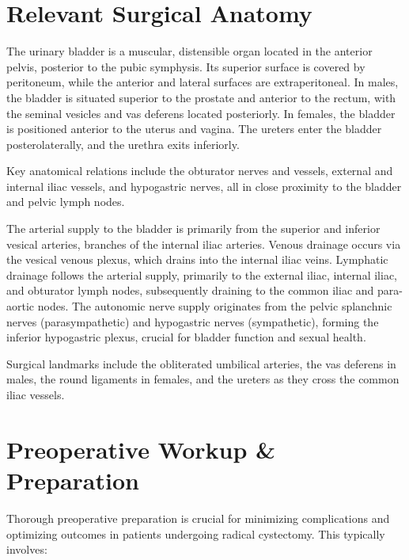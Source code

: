 \section*{Relevant Surgical Anatomy}
The urinary bladder is a muscular, distensible organ located in the anterior pelvis, posterior to the pubic symphysis. Its superior surface is covered by peritoneum, while the anterior and lateral surfaces are extraperitoneal. In males, the bladder is situated superior to the prostate and anterior to the rectum, with the seminal vesicles and vas deferens located posteriorly. In females, the bladder is positioned anterior to the uterus and vagina. The ureters enter the bladder posterolaterally, and the urethra exits inferiorly. 

Key anatomical relations include the obturator nerves and vessels, external and internal iliac vessels, and hypogastric nerves, all in close proximity to the bladder and pelvic lymph nodes. 

The arterial supply to the bladder is primarily from the superior and inferior vesical arteries, branches of the internal iliac arteries. Venous drainage occurs via the vesical venous plexus, which drains into the internal iliac veins. Lymphatic drainage follows the arterial supply, primarily to the external iliac, internal iliac, and obturator lymph nodes, subsequently draining to the common iliac and para-aortic nodes. The autonomic nerve supply originates from the pelvic splanchnic nerves (parasympathetic) and hypogastric nerves (sympathetic), forming the inferior hypogastric plexus, crucial for bladder function and sexual health. 

Surgical landmarks include the obliterated umbilical arteries, the vas deferens in males, the round ligaments in females, and the ureters as they cross the common iliac vessels.

\section*{Preoperative Workup \& Preparation}
Thorough preoperative preparation is crucial for minimizing complications and optimizing outcomes in patients undergoing radical cystectomy. This typically involves:

